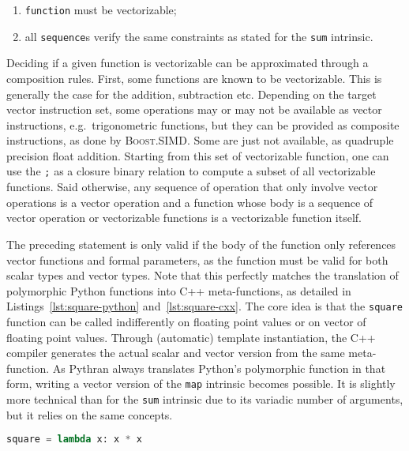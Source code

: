 \documentclass[10pt]{sigplanconf}
\providecommand{\boostsimd}{\textsc{Boost.SIMD}}
\begin{document}
\begin{enumerate}

    \item[\label{enu:pure}] \texttt{function} must be vectorizable;
    \item[\label{enu:sequence}] all \texttt{sequence}s verify the same constraints as stated for the \texttt{sum} intrinsic.

\end{enumerate}

Deciding if a given function is vectorizable can be approximated through a
composition rules. First, some functions are known to be vectorizable. This is
generally the case for the addition, subtraction etc. Depending on the target
vector instruction set, some operations may or may not be available as vector
instructions, e.g.\ trigonometric functions, but they can be provided as
composite instructions, as done by \boostsimd. Some are just not available, as
quadruple precision float addition. Starting from this set of vectorizable
function, one can use the \texttt{;} as a closure binary relation to compute a
subset of all vectorizable functions. Said otherwise, any sequence of operation
that only involve vector operations is a vector operation and a function whose
body is a sequence of vector operation or vectorizable functions is a
vectorizable function itself.

The preceding statement is only valid if the body of the function only
references vector functions and formal parameters, as the function must be
valid for both scalar types and vector types. Note that this perfectly matches
the translation of polymorphic Python functions into C++ meta-functions, as
detailed in Listings~\ref{lst:square-python} and~\ref{lst:square-cxx}. The core
idea is that the \texttt{square} function can be called indifferently on
floating point values or on vector of floating point values. Through
(automatic) template instantiation, the C++ compiler generates the actual
scalar and vector version from the same meta-function. As Pythran always
translates Python's polymorphic function in that form, writing a vector version
of the \texttt{map} intrinsic becomes possible. It is slightly more technical
than for the \texttt{sum} intrinsic due to its variadic number of arguments,
but it relies on the same concepts.

\begin{lstlisting}[language=python, label={lst:square-python}, caption={Python implementation of the square function.}]
square = lambda x: x * x
\end{lstlisting}
\end{document}
